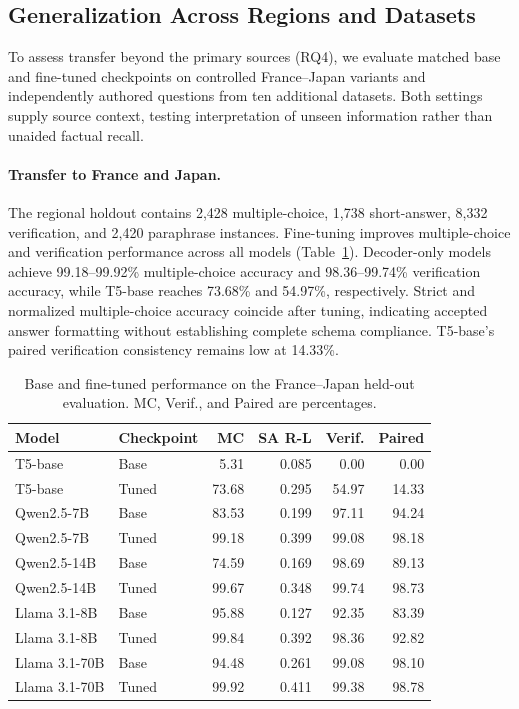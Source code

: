 \documentclass[a4paper,fleqn]{cas-sc}
\begin{document}
\subsection{Generalization Across Regions and Datasets}
\label{sec:generalization_results}

To assess transfer beyond the primary sources (RQ4), we evaluate matched base and fine-tuned checkpoints on controlled France--Japan variants and independently authored questions from ten additional datasets. Both settings supply source context, testing interpretation of unseen information rather than unaided factual recall.

\paragraph{Transfer to France and Japan.}
The regional holdout contains 2,428 multiple-choice, 1,738 short-answer, 8,332 verification, and 2,420 paraphrase instances. Fine-tuning improves multiple-choice and verification performance across all models (Table~\ref{tab:regional_transfer}). Decoder-only models achieve 99.18--99.92\% multiple-choice accuracy and 98.36--99.74\% verification accuracy, while T5-base reaches 73.68\% and 54.97\%, respectively. Strict and normalized multiple-choice accuracy coincide after tuning, indicating accepted answer formatting without establishing complete schema compliance. T5-base's paired verification consistency remains low at 14.33\%.

\begin{table}[htbp]
\centering
\small
\caption{Base and fine-tuned performance on the France--Japan held-out evaluation. MC, Verif., and Paired are percentages.}
\label{tab:regional_transfer}
\begin{tabular}{llrrrr}
\toprule
Model & Checkpoint & MC & SA R-L & Verif. & Paired \\
\midrule
T5-base & Base & 5.31 & 0.085 & 0.00 & 0.00 \\
T5-base & Tuned & 73.68 & 0.295 & 54.97 & 14.33 \\
Qwen2.5-7B & Base & 83.53 & 0.199 & 97.11 & 94.24 \\
Qwen2.5-7B & Tuned & 99.18 & 0.399 & 99.08 & 98.18 \\
Qwen2.5-14B & Base & 74.59 & 0.169 & 98.69 & 89.13 \\
Qwen2.5-14B & Tuned & 99.67 & 0.348 & 99.74 & 98.73 \\
Llama 3.1-8B & Base & 95.88 & 0.127 & 92.35 & 83.39 \\
Llama 3.1-8B & Tuned & 99.84 & 0.392 & 98.36 & 92.82 \\
Llama 3.1-70B & Base & 94.48 & 0.261 & 99.08 & 98.10 \\
Llama 3.1-70B & Tuned & 99.92 & 0.411 & 99.38 & 98.78 \\
\bottomrule
\end{tabular}
\end{table}
\end{document}
